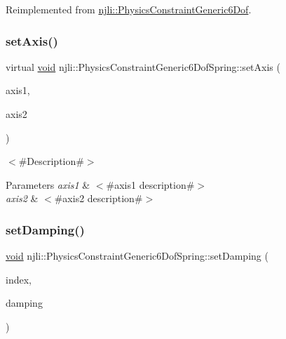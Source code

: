 Reimplemented from \mbox{\hyperlink{classnjli_1_1_physics_constraint_generic6_dof_adebf86567407706023e5800b59308635}{njli\+::\+Physics\+Constraint\+Generic6\+Dof}}.

\mbox{\label{classnjli_1_1_physics_constraint_generic6_dof_spring_ac8d968dd1b3e929978635ec8fcdf8238}} 
\subsubsection{\texorpdfstring{set\+Axis()}{setAxis()}}
{\footnotesize\ttfamily virtual \mbox{\hyperlink{_thread_8h_af1e856da2e658414cb2456cb6f7ebc66}{void}} njli\+::\+Physics\+Constraint\+Generic6\+Dof\+Spring\+::set\+Axis (\begin{DoxyParamCaption}\item[{const bt\+Vector3 \&}]{axis1,  }\item[{const bt\+Vector3 \&}]{axis2 }\end{DoxyParamCaption})\hspace{0.3cm}{\ttfamily [virtual]}}

$<$\#\+Description\#$>$


\begin{DoxyParams}{Parameters}
{\em axis1} & $<$\#axis1 description\#$>$ \\
\hline
{\em axis2} & $<$\#axis2 description\#$>$ \\
\hline
\end{DoxyParams}
\mbox{\label{classnjli_1_1_physics_constraint_generic6_dof_spring_afd76f8cca3ad0d36b0426c2ee8ed2842}} 
\subsubsection{\texorpdfstring{set\+Damping()}{setDamping()}}
{\footnotesize\ttfamily \mbox{\hyperlink{_thread_8h_af1e856da2e658414cb2456cb6f7ebc66}{void}} njli\+::\+Physics\+Constraint\+Generic6\+Dof\+Spring\+::set\+Damping (\begin{DoxyParamCaption}\item[{int}]{index,  }\item[{\mbox{\hyperlink{_util_8h_a5f6906312a689f27d70e9d086649d3fd}{f32}}}]{damping }\end{DoxyParamCaption})}

